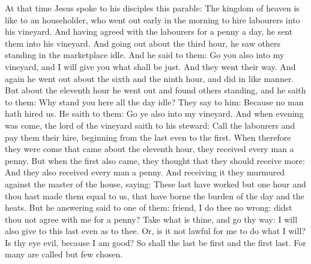 \begin{multicols}{2}
At that time Jesus spoke to his disciples this parable:
The kingdom of heaven is like to an householder, who went out early in the
morning to hire labourers into his vineyard.  And having agreed with the
labourers for a penny a day, he sent them into his vineyard.  And going out
about the third hour, he saw others standing in the marketplace idle.  And he
said to them: Go you also into my vineyard, and I will give you what shall be
just.  And they went their way. And again he went out about the sixth and the
ninth hour, and did in like manner.  But about the eleventh hour he went out
and found others standing, and he saith to them: Why stand you here all the day
idle?  They say to him: Because no man hath hired us. He saith to them: Go ye
also into my vineyard.  And when evening was come, the lord of the vineyard
saith to his steward: Call the labourers and pay them their hire, beginning
from the last even to the first.  When therefore they were come that came about
the eleventh hour, they received every man a penny.  But when the first also
came, they thought that they should receive more: And they also received every
man a penny.  And receiving it they murmured against the master of the house,
saying: These last have worked but one hour and thou hast made them equal to
us, that have borne the burden of the day and the heats.  But he answering said
to one of them: friend, I do thee no wrong: didst thou not agree with me for a
penny?  Take what is thine, and go thy way: I will also give to this last even
as to thee.  Or, is it not lawful for me to do what I will? Is thy eye evil,
because I am good?   So shall the last be first and the first
last. For many are called but few chosen.


\bigskip




\end{multicols}

